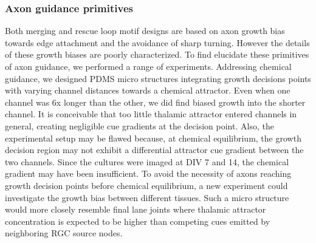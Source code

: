 \subsubsection{Axon guidance primitives}
Both merging and rescue loop motif designs are based on axon growth bias towards
edge attachment and the avoidance of sharp turning. However the details of these
growth biases are poorly characterized. To find elucidate these primitives of
axon guidance, we performed a range of experiments. Addressing chemical
guidance, we designed PDMS micro structures integrating growth decisions points
with varying channel distances towards a chemical attractor. Even when one
channel was 6x longer than the other, we did find biased growth into the shorter
channel. It is conceivable that too little thalamic attractor entered channels
in general, creating negligible cue gradients at the decision point.
Also, the experimental setup may be flawed because, at chemical equilibrium, the
growth decision region may not exhibit a differential attractor cue gradient
between the two channels. Since the cultures were imaged at DIV 7 and 14, the
chemical gradient may have been insufficient. To avoid the necessity of axons
reaching growth decision points before chemical equilibrium, a new experiment
could investigate the growth bias between different tissues. Such a micro
structure would more closely resemble final lane joints where thalamic attractor
concentration is expected to be higher than competing cues emitted by
neighboring RGC source nodes. \\

